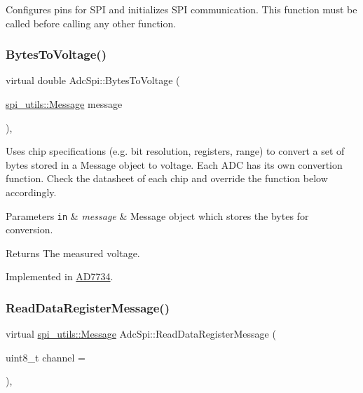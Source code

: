 Configures pins for S\+PI and initializes S\+PI communication. This function must be called before calling any other function. \mbox{\label{classAdcSpi_a25a1deb55a9f0e71a405ca47a41f3804}} 
\subsubsection{\texorpdfstring{Bytes\+To\+Voltage()}{BytesToVoltage()}}
{\footnotesize\ttfamily virtual double Adc\+Spi\+::\+Bytes\+To\+Voltage (\begin{DoxyParamCaption}\item[{\mbox{\hyperlink{structspi__utils_1_1Message}{spi\+\_\+utils\+::\+Message}}}]{message }\end{DoxyParamCaption})\hspace{0.3cm}{\ttfamily [protected]}, {}}

Uses chip specifications (e.\+g. bit resolution, registers, range) to convert a set of bytes stored in a Message object to voltage. Each A\+DC has its own convertion function. Check the datasheet of each chip and override the function below accordingly. 
\begin{DoxyParams}[1]{Parameters}
\mbox{\tt in}  & {\em message} & Message object which stores the bytes for conversion. \\
\hline
\end{DoxyParams}
\begin{DoxyReturn}{Returns}
The measured voltage. 
\end{DoxyReturn}


Implemented in \mbox{\hyperlink{classAD7734_aa13b49141e69a45508998004a208afdc}{A\+D7734}}.

\mbox{\label{classAdcSpi_a3578f18e1976d9e2b075a3fbdc003517}} 
\subsubsection{\texorpdfstring{Read\+Data\+Register\+Message()}{ReadDataRegisterMessage()}}
{\footnotesize\ttfamily virtual \mbox{\hyperlink{structspi__utils_1_1Message}{spi\+\_\+utils\+::\+Message}} Adc\+Spi\+::\+Read\+Data\+Register\+Message (\begin{DoxyParamCaption}\item[{uint8\+\_\+t}]{channel = {} }\end{DoxyParamCaption})\hspace{0.3cm}{\ttfamily [protected]}, {}}


